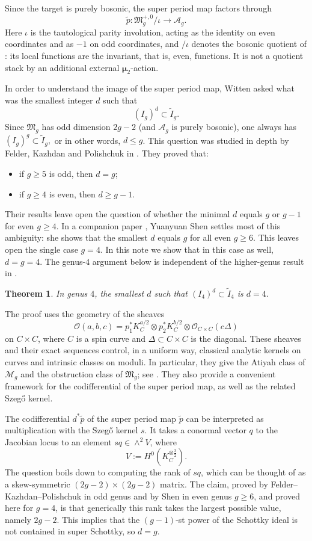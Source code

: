 \documentclass[11pt]{article}
\newtheorem{theorem}{Theorem}[section]
\newcommand{\OO}{\mathcal O}
\newcommand{\MM}{\mathcal M}
\newcommand{\FM}{\mathfrak M}
\newcommand{\Aa}{\mathcal A}
\begin{document}
Since the target is purely bosonic, the super period map factors through
\[
\widetilde p:\FM_g^{+,0}/\iota\longrightarrow\Aa_g.
\]
Here $\iota$ is the tautological parity involution, acting as the identity
on even coordinates and as $-1$ on odd coordinates, and $/\iota$ denotes
the bosonic quotient of \cite{CV}: its local functions are the invariant,
that is, even, functions. It is not a quotient stack by an additional
external $\boldsymbol\mu_2$-action.


In order to understand the image of the super period map, Witten asked what was the smallest integer $d$ such that
\[
(I_g)^d\subset \widetilde I_g.
\]
Since $\FM_g$ has odd dimension $2g-2$ (and $\Aa_g$ is purely bosonic), one always has
$(I_g)^g\subset \widetilde I_g,$
or in other words, $d \leq g$.
This question was studied in depth by Felder, Kazhdan and Polishchuk in {\cite[Theorem~8.3]{FKP}}.
They proved that:
\begin{itemize}[leftmargin=2em]
\item if $g\geq5$ is odd, then $d=g$;
\item if $g\geq4$ is even, then $d\ge g-1$.
\end{itemize}
Their results leave open the question of whether the minimal $d$ equals $g$ or $g-1$ for even $g\ge 4$.
In a companion paper \cite{S}, Yuanyuan Shen settles most of this ambiguity:
she shows that the smallest $d$ equals $g$ for all even $g\ge 6$.
This leaves open the single case $g=4$. In this note we show that in this case as well, $d=g=4$.
{The genus-$4$ argument below is independent of the higher-genus result in \cite{S}.}


\begin{theorem}\label{thm:main}
In genus $4$, the smallest $d$ such that
$(I_4)^d\subset \widetilde I_4$
is $d=4.$
\end{theorem}


The proof uses the geometry of the sheaves
\[
\OO(a,b,c)=p_1^*K_C^{a/2}\otimes p_2^*K_C^{b/2}\otimes \OO_{C\times C}(c\Delta)
\]
on $C\times C$, where $C$ is a spin curve and $\Delta\subset C\times C$ is the diagonal.
These sheaves and their exact sequences control, in a uniform way,
classical analytic kernels on curves and intrinsic classes on moduli.
In particular, they give the Atiyah class of $\MM_g$ and the obstruction class of $\FM_g$;
see \cite{DW2}.
They also provide a convenient framework for the codifferential of the super period map,
as well as the related Szeg\H{o} kernel.

The codifferential ${d^*\widetilde{p}}$ of the super period map $\widetilde{p}$
can be interpreted as multiplication with the Szeg\H{o} kernel $s$.
It takes a conormal vector $q$ to the Jacobian locus
to an element $sq\in \wedge^2 V$, where
\[
V:=H^0(K_C^{\otimes \frac32}).
\]
The question boils down to computing the rank of $sq$,
which can be thought of as a skew-symmetric $(2g-2)\times (2g-2)$ matrix.
The claim, proved by Felder--Kazhdan--Polishchuk in odd genus and by Shen in even genus $g\ge 6$, and proved here for $g=4$,
is that generically this rank takes the largest possible value, namely $2g-2$.
This implies that the $(g-1)$-st power of the Schottky ideal is not contained in super Schottky,
so $d=g$.
\end{document}
